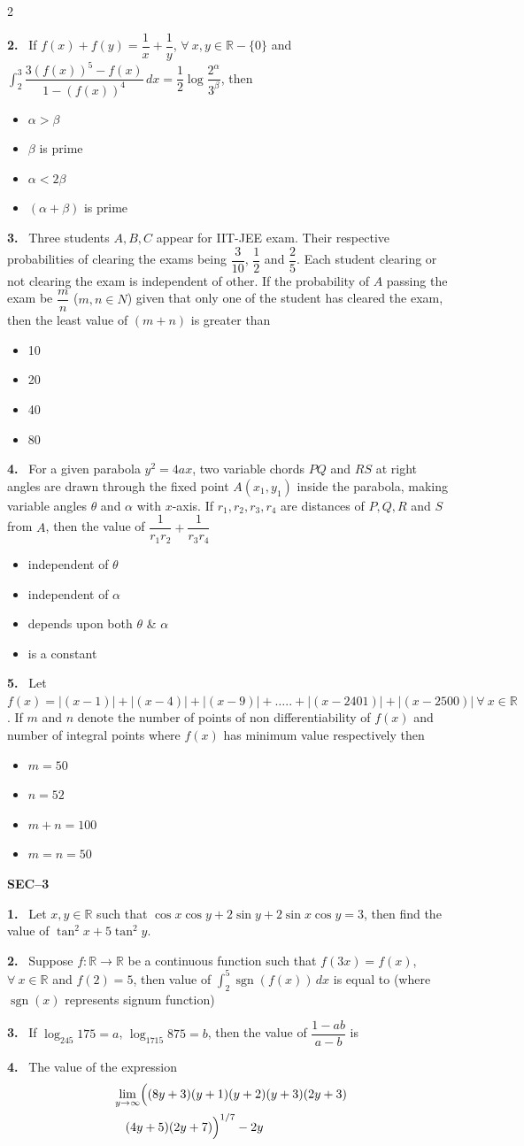 \documentclass[10pt]{extarticle}
\newcommand{\sect}[1]{\par\smallskip\noindent\textbf{#1}\par}
\newcommand{\qn}[1]{\par\smallskip\noindent\textbf{#1.}~}
\newenvironment{qoptions}{\begin{itemize}[leftmargin=1.8em,itemsep=1pt,topsep=2pt,label={}]}{\end{itemize}}
\newcommand{\opt}[2]{\item[(#1)] #2}
\begin{document}
\begin{multicols}{2}
\qn{2} If $f(x)+f(y)=\dfrac1x+\dfrac1y$, $\forall\ x,y\in\mathbb R-\{0\}$ and $\displaystyle\int_2^3\dfrac{3(f(x))^5-f(x)}{1-(f(x))^4}\,dx=\dfrac12\log\dfrac{2^\alpha}{3^\beta}$, then
\begin{qoptions}
\opt{A}{$\alpha>\beta$}
\opt{B}{$\beta$ is prime}
\opt{C}{$\alpha<2\beta$}
\opt{D}{$(\alpha+\beta)$ is prime}
\end{qoptions}
\qn{3} Three students $A,B,C$ appear for IIT-JEE exam. Their respective probabilities of clearing the exams being $\dfrac3{10}$, $\dfrac12$ and $\dfrac25$. Each student clearing or not clearing the exam is independent of other. If the probability of $A$ passing the exam be $\dfrac mn$ ($m,n\in N$) given that only one of the student has cleared the exam, then the least value of $(m+n)$ is greater than
\begin{qoptions}
\opt{A}{10}
\opt{B}{20}
\opt{C}{40}
\opt{D}{80}
\end{qoptions}
\qn{4} For a given parabola $y^2=4ax$, two variable chords $PQ$ and $RS$ at right angles are drawn through the fixed point $A(x_1,y_1)$ inside the parabola, making variable angles $\theta$ and $\alpha$ with $x$-axis. If $r_1,r_2,r_3,r_4$ are distances of $P,Q,R$ and $S$ from $A$, then the value of $\dfrac1{r_1r_2}+\dfrac1{r_3r_4}$
\begin{qoptions}
\opt{A}{independent of $\theta$}
\opt{B}{independent of $\alpha$}
\opt{C}{depends upon both $\theta$ \& $\alpha$}
\opt{D}{is a constant}
\end{qoptions}
\qn{5} Let $f(x)=|(x-1)|+|(x-4)|+|(x-9)|+\ldots..+|(x-2401)|+|(x-2500)|\ \forall\ x\in\mathbb R$. If $m$ and $n$ denote the number of points of non differentiability of $f(x)$ and number of integral points where $f(x)$ has minimum value respectively then
\begin{qoptions}
\opt{A}{$m=50$}
\opt{B}{$n=52$}
\opt{C}{$m+n=100$}
\opt{D}{$m=n=50$}
\end{qoptions}
\sect{SEC--3}
\qn{1} Let $x,y\in\mathbb R$ such that $\cos x\cos y+2\sin y+2\sin x\cos y=3$, then find the value of $\tan^2x+5\tan^2y$.
\qn{2} Suppose $f:\mathbb R\to\mathbb R$ be a continuous function such that $f(3x)=f(x)$, $\forall\ x\in\mathbb R$ and $f(2)=5$, then value of $\displaystyle\int_2^5\operatorname{sgn}(f(x))\,dx$ is equal to (where $\operatorname{sgn}(x)$ represents signum function)
\qn{3} If $\log_{245}175=a$, $\log_{1715}875=b$, then the value of $\dfrac{1-ab}{a-b}$ is
\qn{4} The value of the expression
\begin{align*}&\lim_{y\to\infty}\Bigl((8y+3)(y+1)(y+2)(y+3)(2y+3)\\&\quad(4y+5)(2y+7)\Bigr)^{1/7}-2y\end{align*}

\end{multicols}
\end{document}
